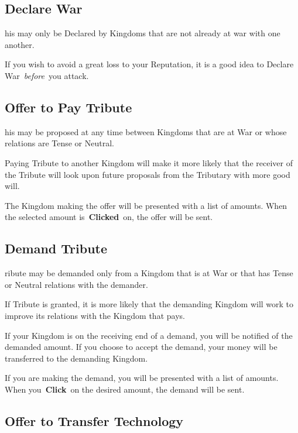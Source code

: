 \subsection{Declare War}


his may only be Declared by Kingdoms that are not already at war with one another.

If you wish to avoid a great loss to your Reputation, it is a good idea to Declare War \textit{before} you attack.

\subsection{Offer to Pay Tribute}


his may be proposed at any time between Kingdoms that are at War or whose relations are Tense or Neutral.

Paying Tribute to another Kingdom will make it more likely that the receiver of the Tribute will look upon future proposals from the Tributary with more good will.

The Kingdom making the offer will be presented with a list of amounts. When the selected amount is \textbf{Clicked} on, the offer will be sent.

\subsection{Demand Tribute}


ribute may be demanded only from a Kingdom that is at War or that has Tense or Neutral relations with the demander.

If Tribute is granted, it is more likely that the demanding Kingdom will work to improve its relations with the Kingdom that pays.

If your Kingdom is on the receiving end of a demand, you will be notified of the demanded amount. If you choose to accept the demand, your money will be transferred to the demanding Kingdom.

If you are making the demand, you will be presented with a list of amounts. When you \textbf{Click} on the desired amount, the demand will be sent.

\subsection{Offer to Transfer Technology}

